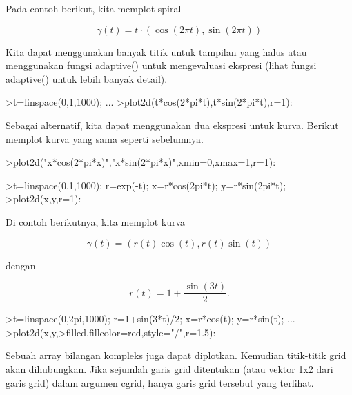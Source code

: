 \documentclass[a4paper,10pt]{article}
\begin{document}
\begin{eulernotebook}
\begin{eulercomment}
\begin{eulercomment}
\begin{eulercomment}
\begin{eulercomment}
\begin{eulercomment}
\begin{eulercomment}
\begin{eulercomment}
Pada contoh berikut, kita memplot spiral

\end{eulercomment}
\begin{eulerformula}
\[
\gamma(t) = t \cdot (\cos(2\pi t),\sin(2\pi t))
\]
\end{eulerformula}
\begin{eulercomment}
Kita dapat menggunakan banyak titik untuk tampilan yang halus atau
menggunakan fungsi adaptive() untuk mengevaluasi ekspresi (lihat
fungsi adaptive() untuk lebih banyak detail).
\end{eulercomment}
\begin{eulerprompt}
>t=linspace(0,1,1000); ...
>plot2d(t*cos(2*pi*t),t*sin(2*pi*t),r=1):
\end{eulerprompt}
\begin{eulercomment}
Sebagai alternatif, kita dapat menggunakan dua ekspresi untuk kurva.
Berikut memplot kurva yang sama seperti sebelumnya.
\end{eulercomment}
\begin{eulerprompt}
>plot2d("x*cos(2*pi*x)","x*sin(2*pi*x)",xmin=0,xmax=1,r=1):
\end{eulerprompt}
\begin{eulerprompt}
>t=linspace(0,1,1000); r=exp(-t); x=r*cos(2pi*t); y=r*sin(2pi*t);
>plot2d(x,y,r=1):
\end{eulerprompt}
\begin{eulercomment}
Di contoh berikutnya, kita memplot kurva

\end{eulercomment}
\begin{eulerformula}
\[
\gamma(t) = (r(t) \cos(t), r(t) \sin(t))
\]
\end{eulerformula}
\begin{eulercomment}
dengan 

\end{eulercomment}
\begin{eulerformula}
\[
r(t) = 1 + \dfrac{\sin(3t)}{2}.
\]
\end{eulerformula}
\begin{eulerprompt}
>t=linspace(0,2pi,1000); r=1+sin(3*t)/2; x=r*cos(t); y=r*sin(t); ...
>plot2d(x,y,>filled,fillcolor=red,style="/",r=1.5):
\end{eulerprompt}
\begin{eulercomment}
Sebuah array bilangan kompleks juga dapat diplotkan. Kemudian
titik-titik grid akan dihubungkan. Jika sejumlah garis grid ditentukan
(atau vektor 1x2 dari garis grid) dalam argumen cgrid, hanya garis
grid tersebut yang terlihat.


\end{eulercomment}
\end{eulercomment}
\end{eulercomment}
\end{eulercomment}
\end{eulercomment}
\end{eulercomment}
\end{eulercomment}
\end{eulernotebook}
\end{document}
